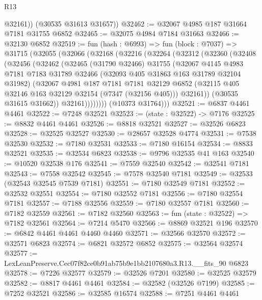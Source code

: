 \begin{lexlean}{R13}
\begin{coremodule}
          @32161))
      (@30535 @31613 @31657))
@32462 := @32067 @4985 @187 @31664 @7181 @31755 @6852
@32465 := @32075 @4984 @7184 @31663
@32466 := @32130 @6852
@32519 := fun (hash : @6993) =>
  fun (block : @7037) =>
  @31715
    (@32055
      (@32066
        (@32168
          (@32216
            (@32264
              (@32312
                (@32360
                  (@32408
                    (@32456
                      (@32462
                        (@32465
                          (@31790 @32466)
                          @31755
                          (@32067
                            @4145
                            @4983
                            @7181
                            @7183
                            @31789
                            @32466
                            (@32093 @405 @31863 @163 @31789 @32104 @31982)
                            (@32067
                              @4981
                              @187
                              @7181
                              @7181
                              @32129
                              @6852
                              (@32115 @405 @32146 @163 @32129 @32154 (@7347 (@32156 @405)))
                              @32161))
                          (@30535 @31615 @31662))
                        @32161))))))))
        (@10373 @31764)))
@32521 := @6837 @4461 @4461
@32522 := @7248 @32521
@32523 := (state : @32522) -> @7176
@32525 := @8832 @4461 @4461
@32526 := @8818 @32521
@32527 := @32526 @6823
@32528 := @32525 @32527
@32530 := @28657 @32528 @4774
@32531 := @7538 @32530
@32532 := @7180 @32531
@32533 := @7180 @16154
@32534 := @8833 @32521
@32535 := @32534 @6823
@32538 := @9796 @32535 @41 @163
@32540 := @10520 @32538 @176
@32541 := @7559 @32540
@32542 := @32541 @7181
@32543 := @7558 @32542
@32545 := @7578 @32540 @7181
@32549 := @32533 (@32543 @32545 @7539 @7181)
@32551 := @7180 @32549 @7181
@32552 := @32532 @32551
@32554 := @7180 @32552 @7181
@32556 := @7180 @32554 @7181
@32557 := @7188 @32556
@32559 := @7180 @32557 @7181
@32560 := @7182 @32559
@32561 := @7182 @32560
@32563 := fun (state : @32522) => @7182 @32561
@32564 := @7214 @5470
@32566 := @8869 @32521 @196
@32570 := @6842 @4461 @4461 @4460 @4460
@32571 := @32566 @32570
@32572 := @32571 @6823
@32574 := @6821 @32572 @6852
@32575 := @32564 @32574
@32577 := LexLeanPreserve.Cec07f82ce0b91ab75b9e1bb2107680a3.R13.__fits_90 @6823
@32578 := @7226 @32577
@32579 := @32526 @7201
@32580 := @32525 @32579
@32582 := @8817 @4461 @4461
@32584 := @32582 (@32526 @7199)
@32585 := @7252 @32521
@32586 := @32585 @16574
@32588 := @7251 @4461 @4461

\end{coremodule}
\end{lexlean}
